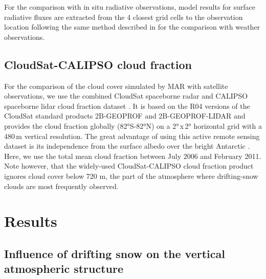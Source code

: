 \documentclass[draft]{agujournal2019}
\begin{document}
For the comparison with in situ radiative observations, model results for surface radiative fluxes are extracted from the 4 closest grid cells to the observation location following the same method described in  for the comparison with weather observations.

\subsection{CloudSat-CALIPSO cloud fraction}
For the comparison of the cloud cover simulated by MAR with satellite observations, we use the combined CloudSat spaceborne radar and CALIPSO spaceborne lidar cloud fraction dataset \cite{kay2009}. It is based on the R04 versions of the CloudSat standard products 2B-GEOPROF \cite{marchand2008} and 2B-GEOPROF-LIDAR \cite{mace2009} and provides the cloud fraction globally (82°S-82°N) on a 2°\,x\,2° horizontal grid with a 480\,m vertical resolution. The great advantage of using this active remote sensing dataset is its independence from the surface albedo over the bright Antarctic \cite{kay2016}. Here, we use the total mean cloud fraction between July 2006 and February 2011. Note however, that the widely-used CloudSat-CALIPSO cloud fraction product ignores cloud cover below 720 m, the part of the atmosphere where drifting-snow clouds are most frequently observed.

\section{Results}

\subsection{Influence of drifting snow on the vertical atmospheric structure}
\end{document}
